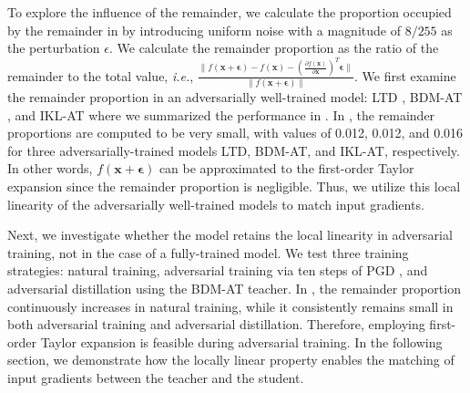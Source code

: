 \documentclass{article} %
\newcommand{\ie}{\emph{i.e.}}
\begin{document}
To explore the influence of the remainder, we calculate the proportion occupied by the remainder in  by introducing uniform noise with a magnitude of $8/255$ as the perturbation $\epsilon$.
We calculate the remainder proportion as the ratio of the remainder to the total value, \ie, $\frac{\|f(\textbf{x} + \boldsymbol{\epsilon}) - f(\textbf{x}) - \left( \frac{\partial f(\textbf{x})}{\partial \textbf{x}} \right)^T \boldsymbol{\epsilon} \|}{\|f(\textbf{x} + \boldsymbol{\epsilon})\|}$.
We first examine the remainder proportion in an adversarially well-trained model: LTD \citep{LTD}, BDM-AT \citep{wang2023better}, and IKL-AT \citep{cui2023decoupled} where we summarized the performance in .
In , the remainder proportions are computed to be very small, with values of 0.012, 0.012, and 0.016 for three adversarially-trained models LTD, BDM-AT, and IKL-AT, respectively.
In other words, $f(\textbf{x} + \boldsymbol{\epsilon})$ can be approximated to the first-order Taylor expansion since the remainder proportion is negligible.
Thus, we utilize this local linearity of the adversarially well-trained models to match input gradients.

Next, we investigate whether the model retains the local linearity in adversarial training, not in the case of a fully-trained model.
We test three training strategies: natural training, adversarial training via ten steps of PGD \citep{PGD}, and adversarial distillation \citep{ard} using the BDM-AT teacher.
In , the remainder proportion continuously increases in natural training, while it consistently remains small in both adversarial training and adversarial distillation.
Therefore, employing first-order Taylor expansion is feasible during adversarial training.
In the following section, we demonstrate how the locally linear property enables the matching of input gradients between the teacher and the student.
\end{document}
